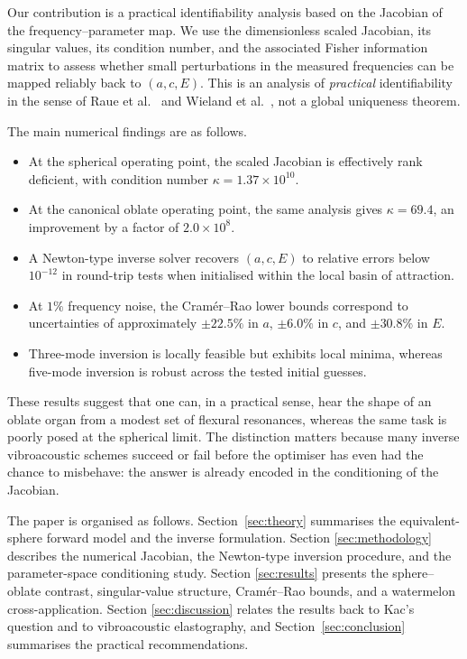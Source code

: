 Our contribution is a practical identifiability analysis based on the Jacobian
of the frequency--parameter map.  We use the dimensionless scaled Jacobian,
its singular values, its condition number, and the associated Fisher
information matrix to assess whether small perturbations in the measured
frequencies can be mapped reliably back to $(a,c,E)$.  This is an analysis of
\emph{practical} identifiability in the sense of Raue et al.~\cite{Raue2009}
and Wieland et al.~\cite{Wieland2021}, not a global uniqueness theorem.

The main numerical findings are as follows.
\begin{itemize}
  \item At the spherical operating point, the scaled Jacobian is effectively
  rank deficient, with condition number
  $\kappa = 1.37 \times 10^{10}$.
  \item At the canonical oblate operating point, the same analysis gives
  $\kappa = 69.4$, an improvement by a factor of
  $2.0 \times 10^{8}$.
  \item A Newton-type inverse solver recovers $(a,c,E)$ to relative errors
  below $10^{-12}$ in round-trip tests when initialised within the local basin
  of attraction.
  \item At $1\%$ frequency noise, the Cram\'er--Rao lower bounds correspond to
  uncertainties of approximately $\pm 22.5\%$ in $a$, $\pm 6.0\%$ in $c$, and
  $\pm 30.8\%$ in $E$.
  \item Three-mode inversion is locally feasible but exhibits local minima,
  whereas five-mode inversion is robust across the tested initial guesses.
\end{itemize}

These results suggest that one can, in a practical sense, hear the shape of an
oblate organ from a modest set of flexural resonances, whereas the same task is
poorly posed at the spherical limit.  The distinction matters because many
inverse vibroacoustic schemes succeed or fail before the optimiser has even had
the chance to misbehave: the answer is already encoded in the conditioning of
the Jacobian.

The paper is organised as follows.  Section~\ref{sec:theory} summarises the
equivalent-sphere forward model and the inverse formulation.  Section
\ref{sec:methodology} describes the numerical Jacobian, the Newton-type
inversion procedure, and the parameter-space conditioning study.  Section
\ref{sec:results} presents the sphere--oblate contrast, singular-value
structure, Cram\'er--Rao bounds, and a watermelon cross-application.  Section
\ref{sec:discussion} relates the results back to Kac's question and to
vibroacoustic elastography, and Section~\ref{sec:conclusion} summarises the
practical recommendations.
